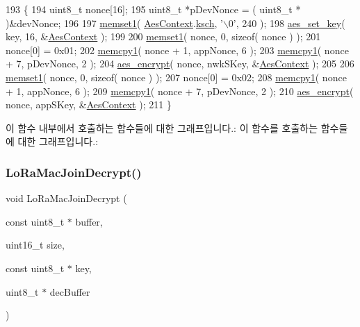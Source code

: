 \begin{DoxyCode}
193 \{
194     uint8\_t nonce[16];
195     uint8\_t *pDevNonce = ( uint8\_t * )&devNonce;
196     
197     \mbox{\hyperlink{utilities_8c_a272ed6d691263d9762c98ed720b1fa3a}{memset1}}( \mbox{\hyperlink{_lo_ra_mac_crypto_8c_a3bd634efd0dfb2a63534d8091949e208}{AesContext}}.\mbox{\hyperlink{structaes__context_a4a906db8aa15b44c3df5838cbd99cb1d}{ksch}}, \textcolor{charliteral}{'\(\backslash\)0'}, 240 );
198     \mbox{\hyperlink{aes_8c_a0ffc37ee1bbb50e7147bf6e7de5d73a1}{aes\_set\_key}}( key, 16, &\mbox{\hyperlink{_lo_ra_mac_crypto_8c_a3bd634efd0dfb2a63534d8091949e208}{AesContext}} );
199 
200     \mbox{\hyperlink{utilities_8c_a272ed6d691263d9762c98ed720b1fa3a}{memset1}}( nonce, 0, \textcolor{keyword}{sizeof}( nonce ) );
201     nonce[0] = 0x01;
202     \mbox{\hyperlink{utilities_8c_abfbe672c7136122f16c9214bc4ba8d21}{memcpy1}}( nonce + 1, appNonce, 6 );
203     \mbox{\hyperlink{utilities_8c_abfbe672c7136122f16c9214bc4ba8d21}{memcpy1}}( nonce + 7, pDevNonce, 2 );
204     \mbox{\hyperlink{aes_8c_ac88fd4e9cb53f78713a8fce1a6fcffc0}{aes\_encrypt}}( nonce, nwkSKey, &\mbox{\hyperlink{_lo_ra_mac_crypto_8c_a3bd634efd0dfb2a63534d8091949e208}{AesContext}} );
205 
206     \mbox{\hyperlink{utilities_8c_a272ed6d691263d9762c98ed720b1fa3a}{memset1}}( nonce, 0, \textcolor{keyword}{sizeof}( nonce ) );
207     nonce[0] = 0x02;
208     \mbox{\hyperlink{utilities_8c_abfbe672c7136122f16c9214bc4ba8d21}{memcpy1}}( nonce + 1, appNonce, 6 );
209     \mbox{\hyperlink{utilities_8c_abfbe672c7136122f16c9214bc4ba8d21}{memcpy1}}( nonce + 7, pDevNonce, 2 );
210     \mbox{\hyperlink{aes_8c_ac88fd4e9cb53f78713a8fce1a6fcffc0}{aes\_encrypt}}( nonce, appSKey, &\mbox{\hyperlink{_lo_ra_mac_crypto_8c_a3bd634efd0dfb2a63534d8091949e208}{AesContext}} );
211 \}
\end{DoxyCode}
이 함수 내부에서 호출하는 함수들에 대한 그래프입니다.\+:
이 함수를 호출하는 함수들에 대한 그래프입니다.\+:
\mbox{\label{group___l_o_r_a_m_a_c___c_r_y_p_t_o_gac2379cd7cbeb6febaa2a7be5d9f04b5c}} 
\subsubsection{\texorpdfstring{Lo\+Ra\+Mac\+Join\+Decrypt()}{LoRaMacJoinDecrypt()}}
{\footnotesize\ttfamily void Lo\+Ra\+Mac\+Join\+Decrypt (\begin{DoxyParamCaption}\item[{const uint8\+\_\+t $\ast$}]{buffer,  }\item[{uint16\+\_\+t}]{size,  }\item[{const uint8\+\_\+t $\ast$}]{key,  }\item[{uint8\+\_\+t $\ast$}]{dec\+Buffer }\end{DoxyParamCaption})}

